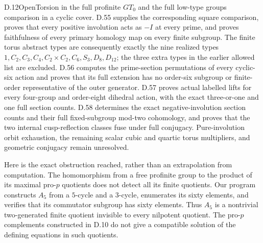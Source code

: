 \begin{claim}{D.12}{Open}{Torsion in the full profinite $GT_0$ and the full low-type groups}
comparison in a cyclic cover. D.55 supplies the corresponding square comparison, proves that every positive involution acts as $-I$ at every prime, and proves faithfulness of every primary homology map on every finite subgroup. The finite torus abstract types are consequently exactly the nine realized types $1,C_2,C_3,C_4,C_2\times C_2,C_6,S_3,D_8,D_{12}$; the three extra types in the earlier allowed list are excluded. D.56 computes the prime-section permutations of every cyclic-six action and proves that its full extension has no order-six subgroup or finite-order representative of the outer generator. D.57 proves actual labelled lifts for every four-group and order-eight dihedral action, with the exact three-or-one and one full section counts. D.58 determines the exact negative-involution section counts and their full fixed-subgroup mod-two cohomology, and proves that the two internal cusp-reflection classes fuse under full conjugacy. Pure-involution orbit exhaustion, the remaining scalar cubic and quartic torus multipliers, and geometric conjugacy remain unresolved.
\end{claim}
Here is the exact obstruction reached, rather than an extrapolation from computation. The homomorphism from a free profinite group to the product of its maximal pro-$p$ quotients does not detect all its finite quotients. Our program constructs $A_5$ from a $5$-cycle and a $3$-cycle, enumerates its sixty elements, and verifies that its commutator subgroup has sixty elements. Thus $A_5$ is a nontrivial two-generated finite quotient invisible to every nilpotent quotient. The pro-$p$ complements constructed in D.10 do not give a compatible solution of the defining equations in such quotients.

